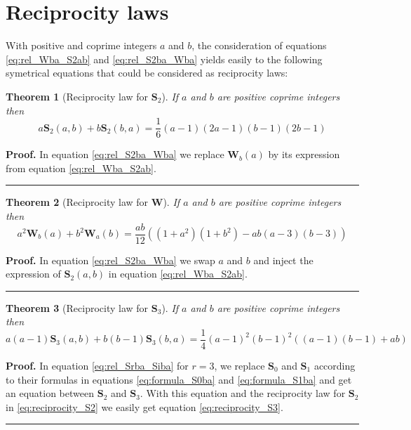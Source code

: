 \documentclass{article}%
\newtheorem{theorem}{Theorem}
\newenvironment{proof}[1][Proof]{\textbf{#1.} }{\ \rule{0.5em}{0.5em}}
\newcommand{\SUMS}[3]{\mathbf{S}_{#1}\left(#2,#3\right)}
\newcommand{\SUMW}[2]{\mathbf{W}_{#1}\left(#2\right)}
\begin{document}
\section{Reciprocity laws}

With positive and coprime integers $a$ and $b$, the consideration of equations \ref{eq:rel_Wba_S2ab} and \ref{eq:rel_S2ba_Wba} yields easily to the following symetrical equations that could be considered as reciprocity laws:

\begin{theorem}[Reciprocity law for $\mathbf{S}_2$]\label{thm:reciprocity_S2} If $a$ and $b$ are positive coprime integers then
\begin{equation}
a \SUMS{2}{a}{b} + b \SUMS{2}{b}{a} = \frac{1}{6}(a-1)(2a-1)(b-1)(2b-1)
\label{eq:reciprocity_S2}
\end{equation}
\end{theorem}

\begin{proof} In equation \ref{eq:rel_S2ba_Wba} we replace $\SUMW{b}{a}$ by its expression from equation \ref{eq:rel_Wba_S2ab}.
\end{proof}

\begin{theorem}[Reciprocity law for $\mathbf{W}$]\label{thm:reciprocity_W} If $a$ and $b$ are positive coprime integers then
\begin{equation}
a^2\SUMW{b}{a}+b^2\SUMW{a}{b}=\frac{ab}{12}\left((1+a^2)(1+b^2)-ab(a-3)(b-3)\right)
\label{eq:reciprocity_W}
\end{equation}
\end{theorem}

\begin{proof} In equation \ref{eq:rel_S2ba_Wba} we swap $a$ and $b$ and inject the expression of $\SUMS{2}{a}{b}$ in equation \ref{eq:rel_Wba_S2ab}.
\end{proof}

\begin{theorem}[Reciprocity law for $\mathbf{S}_3$]\label{thm:reciprocity_S3} If $a$ and $b$ are positive coprime integers then
\begin{equation}
a(a-1) \SUMS{3}{a}{b} + b(b-1) \SUMS{3}{b}{a} = \frac{1}{4}(a-1)^2(b-1)^2\left((a-1)(b-1)+ab\right)
\label{eq:reciprocity_S3}
\end{equation}
\end{theorem}

\begin{proof} In equation \ref{eq:rel_Srba_Siba} for $r=3$, we replace $\mathbf{S}_0$ and $\mathbf{S}_1$ according to their formulas in equations \ref{eq:formula_S0ba} and \ref{eq:formula_S1ba} and get an equation between $\mathbf{S}_2$ and $\mathbf{S}_3$. With this equation and the reciprocity law for $\mathbf{S}_2$ in \ref{eq:reciprocity_S2} we easily get equation \ref{eq:reciprocity_S3}.
\end{proof}
\end{document}
